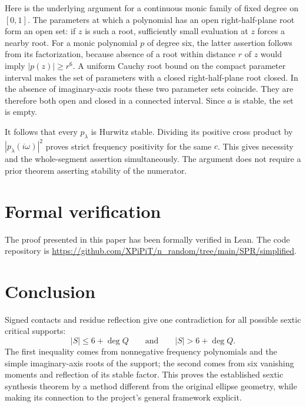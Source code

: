 \documentclass[11pt]{article}
\begin{document}
Here is the underlying argument for a continuous monic family of fixed degree on $[0,1]$. The parameters at which a polynomial has an open right-half-plane root form an open set: if $z$ is such a root, sufficiently small evaluation at $z$ forces a nearby root. For a monic polynomial $p$ of degree six, the latter assertion follows from its factorization, because absence of a root within distance $r$ of $z$ would imply $|p(z)|\ge r^6$. A uniform Cauchy root bound on the compact parameter interval makes the set of parameters with a closed right-half-plane root closed. In the absence of imaginary-axis roots these two parameter sets coincide. They are therefore both open and closed in a connected interval. Since $a$ is stable, the set is empty.

It follows that every $p_\lambda$ is Hurwitz stable. Dividing its positive cross product by $|p_\lambda(i\omega)|^2$ proves strict frequency positivity for the same $c$. This gives necessity and the whole-segment assertion simultaneously. The argument does not require a prior theorem asserting stability of the numerator.

\section{Formal verification}
The proof presented in this paper has been formally verified in Lean. The code repository is \url{https://github.com/XPiPiT/n_random/tree/main/SPR/simplified}.

\section{Conclusion}
Signed contacts and residue reflection give one contradiction for all possible sextic critical supports:
\[
 \boxed{|S|\le6+\deg Q}\qquad\text{and}\qquad
 \boxed{|S|>6+\deg Q}.
\]
The first inequality comes from nonnegative frequency polynomials and the simple imaginary-axis roots of the support; the second comes from six vanishing moments and reflection of its stable factor. This proves the established sextic synthesis theorem by a method different from the original ellipse geometry, while making its connection to the project's general framework explicit.



\end{document}

